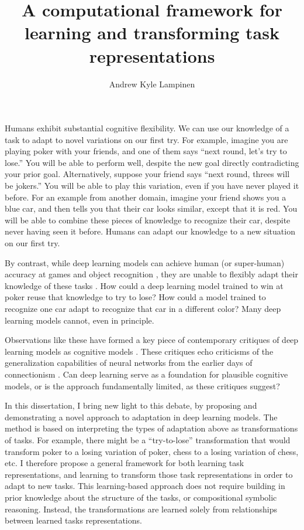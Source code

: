 \documentclass[12pt]{article}
\title{A computational framework for learning and transforming task representations}
\author{Andrew Kyle Lampinen}
\date{}
\begin{document}
\maketitle

Humans exhibit substantial cognitive flexibility. We can use our knowledge of a task to adapt to novel variations on our first try. For example, imagine you are playing poker with your friends, and one of them says ``next round, let's try to lose.'' You will be able to perform well, despite the new goal directly contradicting your prior goal. Alternatively, suppose your friend says ``next round, threes will be jokers.'' You will be able to play this variation, even if you have never played it before. For an example from another domain, imagine your friend shows you a blue car, and then tells you that their car looks similar, except that it is red. You will be able to combine these pieces of knowledge to recognize their car, despite never having seen it before. Humans can adapt our knowledge to a new situation on our first try. 

By contrast, while deep learning models can achieve human (or super-human) accuracy at games \citep{Silver2017,Vinyals2019} and object recognition \citep{Szegedy2016}, they are unable to flexibly adapt their knowledge of these tasks \citep{Lake2016}. How could a deep learning model trained to win at poker reuse that knowledge to try to lose? How could a model trained to recognize one car adapt to recognize that car in a different color? Many deep learning models cannot, even in principle.  

Observations like these have formed a key piece of contemporary critiques of deep learning models as cognitive models \citep{Lake2016,Marcus2018}. These critiques echo criticisms of the generalization capabilities of neural networks from the earlier days of connectionism \citep{Fodor1988}. Can deep learning serve as a foundation for plausible cognitive models, or is the approach fundamentally limited, as these critiques suggest? 

In this dissertation, I bring new light to this debate, by proposing and demonstrating a novel approach to adaptation in deep learning models. The method is based on interpreting the types of adaptation above as transformations of tasks. For example, there might be a ``try-to-lose'' transformation that would transform poker to a losing variation of poker, chess to a losing variation of chess, etc. I therefore propose a general framework for both learning task representations, and learning to transform those task representations in order to adapt to new tasks. This learning-based approach does not require building in prior knowledge about the structure of the tasks, or compositional symbolic reasoning. Instead, the transformations are learned solely from relationships between learned tasks representations. 
\end{document}
